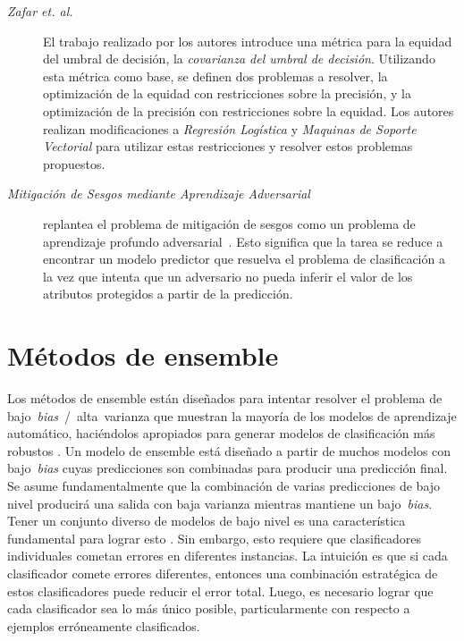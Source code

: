 \begin{description}
\item[\emph{Zafar et. al.} \parencite{zafar2017fairness}] El trabajo realizado por  los autores introduce una métrica para la equidad del umbral de decisión, la \emph{covarianza del umbral de decisión}.
Utilizando esta métrica como base, se definen dos problemas a resolver, la optimización de la equidad con restricciones sobre la precisión, y la optimización de la precisión con restricciones sobre la equidad.
Los autores realizan modificaciones a \emph{Regresión Logística} y \emph{Maquinas de Soporte Vectorial} para utilizar estas restricciones y resolver estos problemas propuestos.

\item[\emph{Mitigación de Sesgos mediante Aprendizaje Adversarial}~\parencite{zhang2018mitigating}] replantea el problema de mitigación de sesgos como un problema de aprendizaje profundo adversarial~\parencite{goodfellow2014adversarial}.
Esto significa que la tarea se reduce a encontrar un modelo predictor que resuelva el problema de clasificación a la vez que intenta que un adversario no pueda inferir el valor de los atributos protegidos a partir de la predicción.

\end{description}

\section{Métodos de ensemble}\label{section:ensembles}

Los métodos de ensemble están diseñados para intentar resolver el problema de bajo~\emph{bias}~/~alta~varianza que muestran la mayoría de los modelos de aprendizaje automático, haciéndolos apropiados para generar modelos de clasificación más robustos \parencite{polikar2006ensemble}.
Un modelo de ensemble está diseñado a partir de muchos modelos con bajo~\emph{bias} cuyas predicciones son combinadas para producir una predicción final.
Se asume fundamentalmente que la combinación de varias predicciones de bajo nivel producirá una salida con baja varianza mientras mantiene un bajo~\emph{bias}.
Tener un conjunto diverso de modelos de bajo nivel es una característica fundamental para lograr esto \parencite{polikar2006ensemble}.
Sin embargo, esto requiere que clasificadores individuales cometan errores en diferentes instancias.
La intuición es que si cada clasificador comete errores diferentes, entonces una combinación estratégica de estos clasificadores puede reducir el error total. Luego, es necesario lograr que cada clasificador sea lo más único posible, particularmente con respecto a ejemplos erróneamente clasificados.

